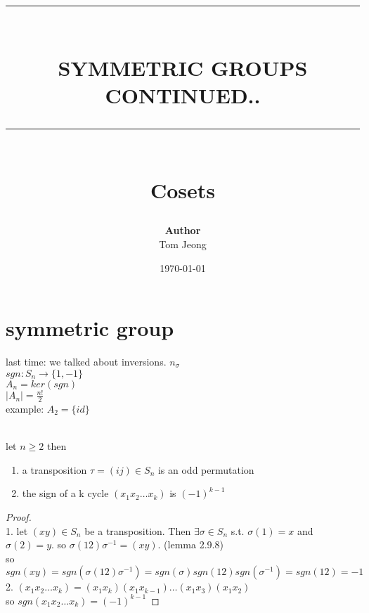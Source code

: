 \documentclass{article}
\newcommand{\HRule}[1]{\rule{\linewidth}{#1}}
\begin{document}

\title{ \normalsize \textsc{}
		\\ [2.0cm]
		\HRule{1.5pt} \\
		\LARGE \textbf{\uppercase{Symmetric Groups continued..}}
		\HRule{2.0pt} \\ [0.6cm] \LARGE{Cosets}
		}

\date{\today}
\author{\textbf{Author} \\ 
		Tom Jeong
        }

\maketitle
\newpage

\tableofcontents
\newpage

\section{symmetric group}
last time: we talked about inversions. $n_{\sigma}$ \\ 
$sgn: S_n \to \{1, -1\}$ \\
$A_n = ker(sgn)$ \\ 
$|A_n| = \frac{n!}{2}$ \\

example: $A_2 = \{id\}$ \\

\begin{proposition}[2.9.17] \leavevmode \\
let $n \geq 2$ then \begin{enumerate}
    \item a transposition $\tau = (ij) \in S_n$ is an odd permutation
    \item the sign of a k cycle $(x_1 x_2 \dots x_k)$ is $(-1)^{k-1}$
\end{enumerate}    
\end{proposition}
\begin{proof}
    \leavevmode \\ 
    1. let $(x y) \in S_n$ be a transposition. Then $\exists \sigma \in S_n$ s.t. $\sigma(1) = x$ and $\sigma(2) = y$. so $\sigma(12)\sigma^{-1} = (xy)$. (lemma 2.9.8)\\
    so $sgn(xy) = sgn(\sigma(12)\sigma^{-1}) = sgn(\sigma)sgn(12)sgn(\sigma^{-1}) = sgn(12) = -1$ \\
2. $(x_1 x_2 \dots x_k) = (x_1 x_k)(x_1 x_{k-1}) \dots (x_1 x_3)(x_1 x_2) $ \\
so $sgn(x_1 x_2 \dots x_k) = (-1)^{k-1}$
\end{proof}
\end{document}
